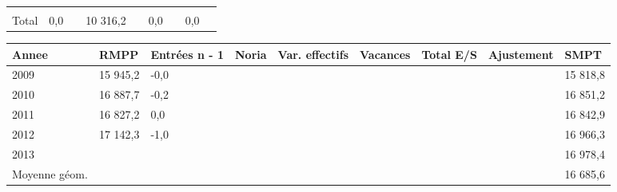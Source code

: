 \begin{longtable}[]{@{}lllllllll@{}}
\begin{minipage}[t]{0.06\columnwidth}
\strut
\end{minipage} & \begin{minipage}[t]{0.13\columnwidth}\raggedright
\strut
\end{minipage} & \begin{minipage}[t]{0.06\columnwidth}\raggedright
\strut
\end{minipage} & \begin{minipage}[t]{0.05\columnwidth}\raggedright
\strut
\end{minipage} & \begin{minipage}[t]{0.06\columnwidth}\raggedright
\strut
\end{minipage}\tabularnewline
\begin{minipage}[t]{0.05\columnwidth}\raggedright
Total\strut
\end{minipage} & \begin{minipage}[t]{0.10\columnwidth}\raggedright
0,0\strut
\end{minipage} & \begin{minipage}[t]{0.06\columnwidth}\raggedright
\strut
\end{minipage} & \begin{minipage}[t]{0.17\columnwidth}\raggedright
10 316,2\strut
\end{minipage} & \begin{minipage}[t]{0.06\columnwidth}\raggedright
\strut
\end{minipage} & \begin{minipage}[t]{0.13\columnwidth}\raggedright
0,0\strut
\end{minipage} & \begin{minipage}[t]{0.06\columnwidth}\raggedright
\strut
\end{minipage} & \begin{minipage}[t]{0.05\columnwidth}\raggedright
0,0\strut
\end{minipage} & \begin{minipage}[t]{0.06\columnwidth}\raggedright
\strut
\end{minipage}\tabularnewline
\bottomrule
\end{longtable}

\begin{longtable}[]{@{}lllllllll@{}}
\toprule
Annee & RMPP & Entrées n - 1 & Noria & Var. effectifs & Vacances & Total
E/S & Ajustement & SMPT\tabularnewline
\midrule
\endhead
2009 & 15 945,2 & -0,0 & & & & & & 15 818,8\tabularnewline
2010 & 16 887,7 & -0,2 & & & & & & 16 851,2\tabularnewline
2011 & 16 827,2 & 0,0 & & & & & & 16 842,9\tabularnewline
2012 & 17 142,3 & -1,0 & & & & & & 16 966,3\tabularnewline
2013 & & & & & & & & 16 978,4\tabularnewline
Moyenne géom. & & & & & & & & 16 685,6\tabularnewline
\bottomrule
\end{longtable}

